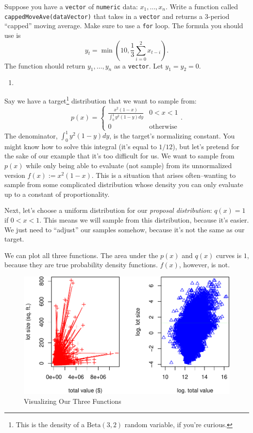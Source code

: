 \documentclass[
  12pt,
  krantz2]{krantz}
\providecommand{\tightlist}{%
  \setlength{\itemsep}{0pt}\setlength{\parskip}{0pt}}
\begin{document}
Suppose you have a \texttt{vector} of \texttt{numeric} data: \(x_1, \ldots, x_n\). Write a function called \texttt{cappedMoveAve(dataVector)} that takes in a \texttt{vector} and returns a 3-period ``capped'' moving average. Make sure to use a \texttt{for} loop. The formula you should use is
\[
y_t = \min\left(10, \frac{1}{3}\sum_{i=0}^2x_{t-i} \right).
\]
The function should return \(y_1, \ldots, y_n\) as a \texttt{vector}. Let \(y_1 = y_2 = 0\).

\begin{enumerate}
\def\labelenumi{\arabic{enumi}.}
\setcounter{enumi}{1}
\tightlist
\item
\end{enumerate}

Say we have a target\footnote{This is the density of a \(\text{Beta}(3,2)\) random variable, if you're curious.} distribution that we want to sample from:
\[
p(x) = 
\begin{cases}
\frac{x^2(1-x)}{\int_0^1 y^2(1-y) dy} & 0 < x < 1 \\
0 & \text{otherwise}
\end{cases}.
\]
The denominator, \(\int_0^1 y^2(1-y) dy\), is the target's normalizing constant. You might know how to solve this integral (it's equal to \(1/12\)), but let's pretend for the sake of our example that it's too difficult for us. We want to sample from \(p(x)\) while only being able to evaluate (not sample) from its unnormalized version \(f(x) := x^2(1-x)\). This is a situation that arises often--wanting to sample from some complicated distribution whose density you can only evaluate up to a constant of proportionality.

Next, let's choose a uniform distribution for our \emph{proposal distribution}: \(q(x) = 1\) if \(0 < x < 1\). This means we will sample from this distribution, because it's easier. We just need to ``adjust'' our samples somehow, because it's not the same as our target.

We can plot all three functions. The area under the \(p(x)\) and \(q(x)\) curves is \(1\), because they are true probability density functions. \(f(x)\), however, is not.

\begin{figure}

{\centering \includegraphics[width=0.4\linewidth]{r_and_python_book_files/figure-latex/unnamed-chunk-168-1} 

}

\caption{Visualizing Our Three Functions}\label{fig:unnamed-chunk-168}
\end{figure}
\end{document}
